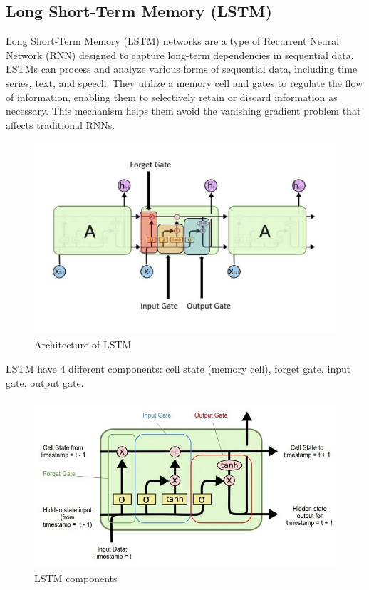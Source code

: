\documentclass{ieeeojies}
\begin{document}
\subsection{Long Short-Term Memory (LSTM)}
Long Short-Term Memory (LSTM) networks are a type of Recurrent Neural Network (RNN) designed to capture long-term dependencies in sequential data. LSTMs can process and analyze various forms of sequential data, including time series, text, and speech. They utilize a memory cell and gates to regulate the flow of information, enabling them to selectively retain or discard information as necessary. This mechanism helps them avoid the vanishing gradient problem that affects traditional RNNs.
\begin{figure}[H]
	\centering
	\begin{minipage}{0.32\textwidth}
		\centering
		\includegraphics[width=1\textwidth]{bibliography/Images/LSTM_Img1.jpg}
		\caption{Architecture of LSTM}
		\label{fig:1}
	\end{minipage}
\end{figure}
LSTM have 4 different components: cell state (memory cell), forget gate, input gate, output gate.
\begin{figure}[H]
	\centering
	\begin{minipage}{0.32\textwidth}
		\centering
		\includegraphics[width=1\textwidth]{bibliography/Images/LSTM_Img2.png}
		\caption{LSTM components}
		\label{fig:1}
	\end{minipage}
\end{figure}
\end{document}
